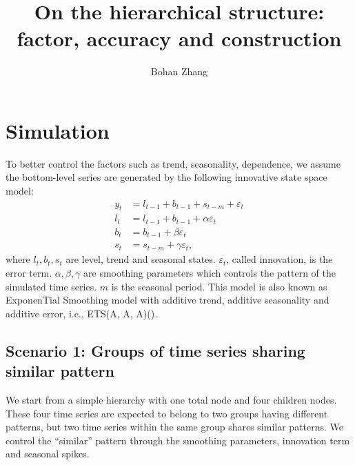 \documentclass[11pt,a4paper]{article}
\title{On the hierarchical structure: factor, accuracy and construction}
\author{Bohan Zhang}
\begin{document}
\maketitle

\section{Simulation}

To better control the factors such as trend, seasonality, dependence, we assume the bottom-level series are generated by the following innovative state space model:
\[
    \begin{aligned}
        y_t &= l_{t-1} + b_{t-1} + s_{t-m} + \varepsilon_t \\    
        l_t &= l_{t-1} + b_{t-1} + \alpha\varepsilon_t \\
        b_t &= b_{t-1} + \beta \varepsilon_t \\
        s_t &= s_{t-m} + \gamma\varepsilon_t,
    \end{aligned}
\]
where $l_t, b_t, s_t$ are level, trend and seasonal states. $\varepsilon_t$, called innovation, is the error term. 
$\alpha, \beta, \gamma$ are smoothing parameters which controls the pattern of the simulated time series. 
$m$ is the seasonal period.
This model is also known as ExponenTial Smoothing model with additive trend, additive seasonality and additive error, i.e., ETS(A, A, A)(). 

\subsection{Scenario 1: Groups of time series sharing similar pattern}
We start from a simple hierarchy with one total node and four children nodes.
These four time series are expected to belong to two groups having different patterns, but two time series within the same group shares similar patterns. 
We control the ``similar'' pattern through the smoothing parameters, innovation term and seasonal spikes.
\end{document}
